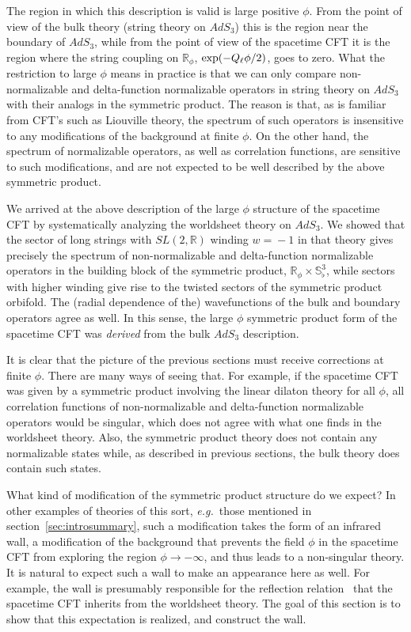 \documentclass[12pt]{article}
\def\sltwo{\ensuremath{SL(2,\bR)}}
\def\sqsphere{{\bS^3_\flat}}
\def\tight#1{\! #1 \!}  %
\def\eg{{e.g.}}
\newcommand{\bR}{{\mathbb R}}
\newcommand{\bS}{{\mathbb S}}
\numberwithin{equation}{section}
\def\eg{{\it e.g.}}
\def\exp{{\rm exp}}
\def\eg{{\it e.g.}}
\begin{document}
The region in which this description is valid is large positive $\phi$. From the point of view of the bulk theory  (string theory on $AdS_3$) this is the region near the boundary of $AdS_3$, while from the point of view of the spacetime CFT it is the region where the string coupling on $\bR_\phi$, $\exp(- Q_\ell\phi/2)$, goes to zero. What the restriction to large $\phi$ means in practice is that we can only compare non-normalizable and delta-function normalizable operators in string theory on $AdS_3$ with their analogs in the symmetric product. The reason is that, as is familiar from CFT's such as Liouville theory, the spectrum of such operators is insensitive to any modifications of the background at finite $\phi$. On the other hand, the spectrum of normalizable operators, as well as correlation functions, are sensitive to such modifications, and are not expected to be well described by the above symmetric product.     

We arrived at the above description of the large $\phi$ structure of the spacetime CFT by systematically analyzing the worldsheet theory on $AdS_3$. We showed that the sector of long strings with $\sltwo$ winding $w\tight=-1$ in that theory gives precisely the spectrum of non-normalizable and delta-function normalizable operators in the building block of the symmetric product, $\bR_\phi\tight\times\sqsphere$, while sectors with higher winding give rise to the twisted sectors of the symmetric product orbifold. The (radial dependence of the) wavefunctions of the bulk and boundary operators agree as well. In this sense, the large $\phi$ symmetric product form of the spacetime CFT was {\it derived} from the bulk $AdS_3$ description. 

It is clear that the picture of the previous sections must receive corrections at finite $\phi$. There are many ways of seeing that. For example, if the spacetime CFT was given by a symmetric product involving the linear dilaton theory for all $\phi$, all correlation functions of non-normalizable and delta-function normalizable operators would be singular, which does not agree with what one finds in the worldsheet theory. Also, the symmetric product theory does not contain any normalizable states while, as described in previous sections, the bulk theory does contain such states. 

What kind of modification of the symmetric product structure do we expect? In other examples of theories of this sort, \eg\ those mentioned in section~\ref{sec:introsummary}, such a modification takes the form of an infrared wall, a modification of the background that prevents the field $\phi$ in the spacetime CFT from exploring the region $\phi\to-\infty$, and thus leads to a non-singular theory. It is natural to expect such a wall to make an appearance here as well. For example, the wall is presumably responsible for the reflection relation \ that the spacetime CFT inherits from the worldsheet theory. The goal of this section is to show that this expectation is realized, and construct the wall.
\end{document}
